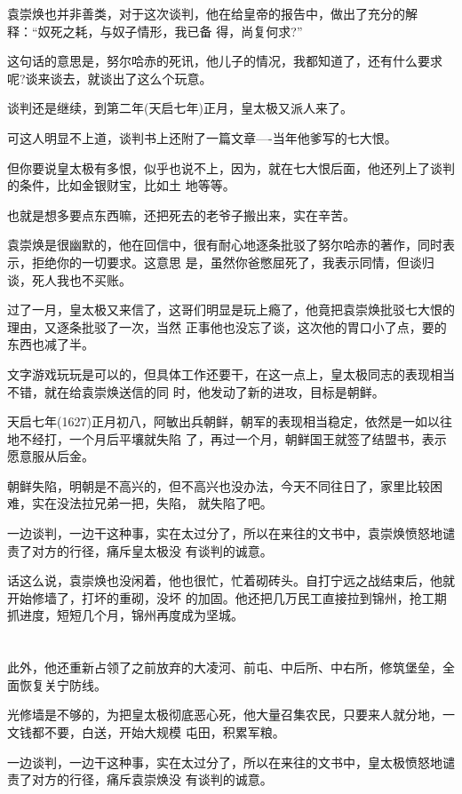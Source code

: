 \documentclass[11pt,a4paper,onecolumn]{article}
\begin{document}
袁崇焕也并非善类，对于这次谈判，他在给皇帝的报告中，做出了充分的解释：``奴死之耗，与奴子情形，我已备
得，尚复何求?''

这句话的意思是，努尔哈赤的死讯，他儿子的情况，我都知道了，还有什么要求呢?谈来谈去，就谈出了这么个玩意。

谈判还是继续，到第二年(天启七年)正月，皇太极又派人来了。

可这人明显不上道，谈判书上还附了一篇文章----当年他爹写的七大恨。

但你要说皇太极有多恨，似乎也说不上，因为，就在七大恨后面，他还列上了谈判的条件，比如金银财宝，比如土
地等等。

也就是想多要点东西嘛，还把死去的老爷子搬出来，实在辛苦。

袁崇焕是很幽默的，他在回信中，很有耐心地逐条批驳了努尔哈赤的著作，同时表示，拒绝你的一切要求。这意思
是，虽然你爸憋屈死了，我表示同情，但谈归谈，死人我也不买账。

过了一月，皇太极又来信了，这哥们明显是玩上瘾了，他竟把袁崇焕批驳七大恨的理由，又逐条批驳了一次，当然
正事他也没忘了谈，这次他的胃口小了点，要的东西也减了半。

文字游戏玩玩是可以的，但具体工作还要干，在这一点上，皇太极同志的表现相当不错，就在给袁崇焕送信的同
时，他发动了新的进攻，目标是朝鲜。

天启七年(1627)正月初八，阿敏出兵朝鲜，朝军的表现相当稳定，依然是一如以往地不经打，一个月后平壤就失陷
了，再过一个月，朝鲜国王就签了结盟书，表示愿意服从后金。

朝鲜失陷，明朝是不高兴的，但不高兴也没办法，今天不同往日了，家里比较困难，实在没法拉兄弟一把，失陷，
就失陷了吧。

一边谈判，一边干这种事，实在太过分了，所以在来往的文书中，袁崇焕愤怒地谴责了对方的行径，痛斥皇太极没
有谈判的诚意。

话这么说，袁崇焕也没闲着，他也很忙，忙着砌砖头。自打宁远之战结束后，他就开始修墙了，打坏的重砌，没坏
的加固。他还把几万民工直接拉到锦州，抢工期抓进度，短短几个月，锦州再度成为坚城。

\section[\thesection]{}

此外，他还重新占领了之前放弃的大凌河、前屯、中后所、中右所，修筑堡垒，全面恢复关宁防线。

光修墙是不够的，为把皇太极彻底恶心死，他大量召集农民，只要来人就分地，一文钱都不要，白送，开始大规模
屯田，积累军粮。

一边谈判，一边干这种事，实在太过分了，所以在来往的文书中，皇太极愤怒地谴责了对方的行径，痛斥袁崇焕没
有谈判的诚意。
\end{document}
